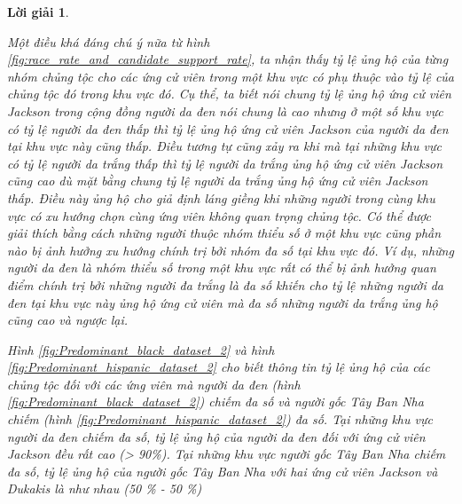 \documentclass[14pt, a4paper]{article}
\theoremstyle{sltheorem}
\theoremstyle{soltheorem}
\newtheorem*{loigiai}{Lời giải}
\begin{document}
\begin{loigiai}
\begin{enumerate}
    Một điều khá đáng chú ý nữa từ hình \ref{fig:race_rate_and_candidate_support_rate}, ta nhận thấy tỷ lệ ủng hộ của từng nhóm chủng tộc cho các ứng cử viên trong một khu vực có phụ thuộc vào tỷ lệ của chủng tộc đó trong khu vực đó.
    Cụ thể, ta biết nói chung tỷ lệ ủng hộ ứng cử viên Jackson trong cộng đồng người da đen nói chung là cao nhưng ở một số khu vực có tỷ lệ người da đen thấp thì tỷ lệ ủng hộ ứng cử viên Jackson của người da đen tại khu vực này cũng thấp.
    Điều tương tự cũng xảy ra khi mà tại những khu vực có tỷ lệ người da trắng thấp thì tỷ lệ người da trắng ủng hộ ứng cử viên Jackson cũng cao dù mặt bằng chung tỷ lệ người da trắng ủng hộ ứng cử viên Jackson thấp.
    Điều này ủng hộ cho giả định láng giềng khi những người trong cùng khu vực có xu hướng chọn cùng ứng viên không quan trọng chủng tộc.
    Có thể được giải thích bằng cách những người thuộc nhóm thiểu số ở một khu vực cũng phần nào bị ảnh hưởng xu hướng chính trị bởi nhóm đa số tại khu vực đó.
    Ví dụ, những người da đen là nhóm thiểu số trong một khu vực rất có thể bị ảnh hưởng quan điểm chính trị bởi những người đa trắng là đa số khiến cho tỷ lệ những người da đen tại khu vực này ủng hộ ứng cử viên mà đa số những người da trắng ủng hộ cũng cao và ngược lại.

    Hình \ref{fig:Predominant_black_dataset_2} và hình \ref{fig:Predominant_hispanic_dataset_2} cho biết thông tin tỷ lệ ủng hộ của các chủng tộc đối với các ứng viên mà người da đen (hình \ref{fig:Predominant_black_dataset_2}) chiếm đa số và người gốc Tây Ban Nha chiếm (hình \ref{fig:Predominant_hispanic_dataset_2}) đa số.
    Tại những khu vực người da đen chiếm đa số, tỷ lệ ủng hộ của người da đen đối với ứng cử viên Jackson đều rất cao (> 90\%).
    Tại những khu vực người gốc Tây Ban Nha chiếm đa số, tỷ lệ ủng hộ của người gốc Tây Ban Nha với hai ứng cử viên Jackson và Dukakis là như nhau (50 \% - 50 \%)


\end{enumerate}
\end{loigiai}
\end{document}
